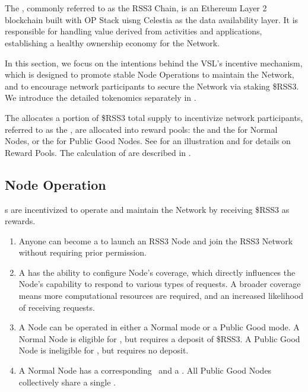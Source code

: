 \section{}
\label{sec:VSL}

The , commonly referred to as the RSS3 Chain, is an Ethereum Layer 2 blockchain built with OP Stack uisng Celestia as the data availability layer.
It is responsible for handling value derived from  activities and applications, establishing a healthy ownership economy for the Network.

In this section, we focus on the intentions behind the \gls{VSL}'s incentive mechanism, which is designed to promote stable Node Operations to maintain the Network, and to encourage network participants to secure the Network via staking \$RSS3.
We introduce the detailed tokenomics separately in .

The  allocates a portion of \$RSS3 total supply to incentivize network participants, referred to as the ,
are allocated into reward pools: the  and the  for Normal Nodes, or the  for Public Good Nodes.
See  for an illustration and  for details on Reward Pools.
The calculation of  are described in .

\subsection{Node Operation}
s are incentivized to operate and maintain the Network by receiving \$RSS3 as rewards.
\begin{enumerate}
    \item Anyone can become a  to launch an RSS3 Node and join the RSS3 Network without requiring prior permission.
    \item A  has the ability to configure Node's coverage, which directly influences the Node's capability to respond to various types of requests. A broader coverage means more computational resources are required, and an increased likelihood of receiving requests.
    \item A Node can be operated in either a Normal mode or a Public Good mode. A Normal Node is eligible for , but requires a deposit of \$RSS3. A Public Good Node is ineligible for , but requires no deposit.
    \item A Normal Node has a corresponding \operationPool\ and a \stakingPool. All Public Good Nodes collectively share a single \publicGoodPool.
\end{enumerate}

